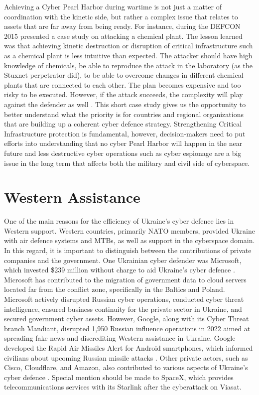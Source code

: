 Achieving a Cyber Pearl Harbor during wartime is not just a matter of coordination with the kinetic side, but rather a complex issue that relates to assets that are far away from being ready. For instance, during the DEFCON 2015 \textcite{krotofil_2015_rocking} presented a case study on attacking a chemical plant. The lesson learned was that achieving kinetic destruction or disruption of critical infrastructure such as a chemical plant is less intuitive than expected. The attacker should have high knowledge of chemicals, be able to reproduce the attack in the laboratory (as the Stuxnet perpetrator did), to be able to overcome changes in different chemical plants that are connected to each other. The plan becomes expensive and too risky to be executed. However, if the attack succeeds, the complexity will play against the defender as well \autocite{drozhzhin_2015_hacking}. This short case study gives us the opportunity to better understand what the priority is for countries and regional organizations that are building up a coherent cyber defence strategy. Strengthening Critical Infrastructure protection is fundamental, however, decision-makers need to put efforts into understanding that no cyber Pearl Harbor will happen in the near future and less destructive cyber operations such as cyber espionage are a big issue in the long term that affects both the military and civil side of cyberspace. 

\section{Western Assistance}

One of the main reasons for the efficiency of Ukraine's cyber defence lies in Western support. Western countries, primarily NATO members, provided Ukraine with air defence systems and MTBs, as well as support in the cyberspace domain. In this regard, it is important to distinguish between the contributions of private companies and the government. One Ukrainian cyber defender was Microsoft, which invested \$239 million without charge to aid Ukraine's cyber defence \autocite{smith_2022_defending}. Microsoft has contributed to the migration of government data to cloud servers located far from the conflict zone, specifically in the Baltics and Poland. Microsoft actively disrupted Russian cyber operations, conducted cyber threat intelligence, ensured business continuity for the private sector in Ukraine, and secured government cyber assets. However, Google, along with its Cyber Threat branch Mandiant, disrupted 1,950 Russian influence operations in 2022 aimed at spreading fake news and discrediting Western assistance in Ukraine. Google developed the Rapid Air Missiles Alert for Android smartphones, which informed civilians about upcoming Russian missile attacks \autocite{huntley_2023_fog}. Other private actors, such as Cisco, Cloudflare, and Amazon, also contributed to various aspects of Ukraine's cyber defence \autocite{beecroft_2022_evaluating}. Special mention should be made to SpaceX, which provides telecommunications services with its Starlink after the cyberattack on Viasat.

